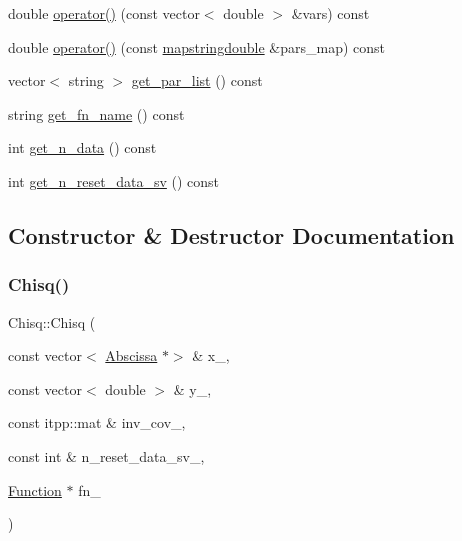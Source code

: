 \begin{DoxyCompactItemize}
\item 
double \mbox{\hyperlink{classChisq_a321122741639e94feeb3bff1eeadd1e7}{operator()}} (const vector$<$ double $>$ \&vars) const
\item 
double \mbox{\hyperlink{classChisq_a32a21d511405fc53af969f0984abc54f}{operator()}} (const \mbox{\hyperlink{lib_2fitting__lib_2includes_8h_a647b481c557c7966517f753340a81d13}{mapstringdouble}} \&pars\+\_\+map) const
\item 
vector$<$ string $>$ \mbox{\hyperlink{classChisq_a2c9e190b411d2e6b225d2ca32b950a1e}{get\+\_\+par\+\_\+list}} () const
\item 
string \mbox{\hyperlink{classChisq_a43f74965844bd0b1aa8a323e973728e6}{get\+\_\+fn\+\_\+name}} () const
\item 
int \mbox{\hyperlink{classChisq_aab815b002c716da22d72ef225aa1bbec}{get\+\_\+n\+\_\+data}} () const
\item 
int \mbox{\hyperlink{classChisq_a5dfe38f15b32fc23fb8530f7a4daf3e0}{get\+\_\+n\+\_\+reset\+\_\+data\+\_\+sv}} () const
\end{DoxyCompactItemize}


\subsection{Constructor \& Destructor Documentation}
\mbox{\label{classChisq_a625fc6e1e3ffc8faa123f2f50f54a22b}} 
\subsubsection{\texorpdfstring{Chisq()}{Chisq()}\hspace{0.1cm}{\footnotesize\ttfamily [1/2]}}
{\footnotesize\ttfamily Chisq\+::\+Chisq (\begin{DoxyParamCaption}\item[{const vector$<$ \mbox{\hyperlink{classAbscissa}{Abscissa}} $\ast$$>$ \&}]{x\+\_\+,  }\item[{const vector$<$ double $>$ \&}]{y\+\_\+,  }\item[{const itpp\+::mat \&}]{inv\+\_\+cov\+\_\+,  }\item[{const int \&}]{n\+\_\+reset\+\_\+data\+\_\+sv\+\_\+,  }\item[{\mbox{\hyperlink{classFunction}{Function}} $\ast$}]{fn\+\_\+ }\end{DoxyParamCaption})}


